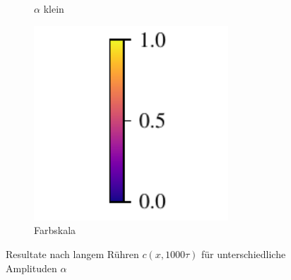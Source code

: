 \begin{frame}{}
\begin{figure}
\begin{subfigure}{0.32\textwidth}
\caption{$\alpha$ klein}
\end{subfigure}
%
\begin{subfigure}{0.32\textwidth}
\centering
\includegraphics[width=0.8\textwidth]{images/colorbar}
\caption{Farbskala}
\end{subfigure}
\caption{Resultate nach langem Rühren $c(x,1000\tau)$
für unterschiedliche Amplituden $\alpha$}
\end{figure}
\end{frame}


